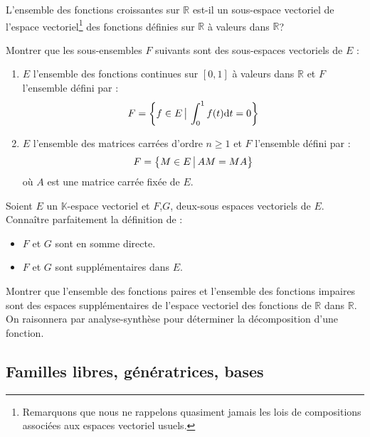 \documentclass[a4paper,twoside,french,10pt]{VcCours}
\newcommand{\dt}{\text{d}t}
\begin{document}
\medskip

\begin{Exercice}{}\end{Exercice} L'ensemble des fonctions croissantes sur $\mathbb{R}$ est-il un sous-espace vectoriel de l'espace vectoriel\footnote{Remarquons que nous ne rappelons quasiment jamais les lois de compositions associées aux espaces vectoriel usuels.} des fonctions définies sur $\mathbb{R}$ à valeurs dans $\mathbb{R}$?

\medskip

\begin{Exercice}{}\end{Exercice} Montrer que les sous-ensembles $F$ suivants sont des sous-espaces vectoriels de $E$ :

\medskip
\begin{enumerate}
\item $E$ l'ensemble des fonctions continues sur $[0,1]$ à valeurs dans $\mathbb{R}$ et $F$ l'ensemble défini par :
$$ F = \left\lbrace f \in E \, \big{\vert} \, \int_{0}^1 f(t) \dt =0 \right\rbrace$$
\item $E$ l'ensemble des matrices carrées d'ordre $n \geq 1$ et $F$ l'ensemble défini par :
$$  F = \left\lbrace M \in E \, \big{\vert} \, AM=MA \right\rbrace$$
où $A$ est une matrice carrée fixée de $E$.
\end{enumerate}

\medskip

\begin{ptc}{}
	Soient $E$ un $\mathbb{K}$-espace vectoriel et $F$,$G$, deux-sous espaces vectoriels de $E$. Connaître parfaitement la définition de :
\begin{itemize}
\item $F$ et $G$ sont en somme directe.
\item $F$ et $G$ sont supplémentaires dans $E$.
\end{itemize}
\end{ptc}

\medskip

\begin{Exercice}{}\end{Exercice} Montrer que l'ensemble des fonctions paires et l'ensemble des fonctions impaires sont des espaces supplémentaires de l'espace vectoriel des fonctions de $\mathbb{R}$ dans $\mathbb{R}$. On raisonnera par analyse-synthèse pour déterminer la décomposition d'une fonction.

\medskip

\subsection{Familles libres, génératrices, bases}
\end{document}
